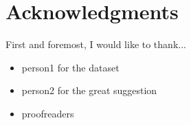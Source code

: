 \chapter{Acknowledgments}

First and foremost, I would like to thank...
\begin{itemize}
\item{person1 for the dataset}
\item{person2 for the great suggestion}
\item{proofreaders}
\end{itemize}